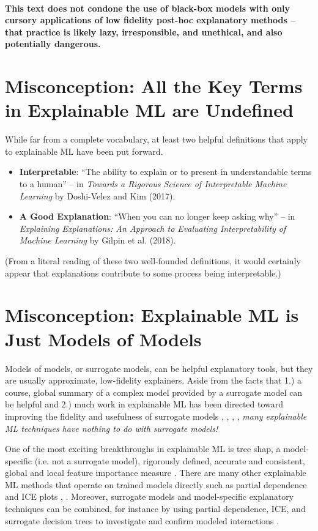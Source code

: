 \documentclass{article}
\begin{document}
\paragraph{This text does not condone the use of black-box models with only cursory applications of low fidelity post-hoc explanatory methods -- that practice is likely lazy, irresponsible, and unethical, and also potentially dangerous.}

\section{Misconception: All the Key Terms in Explainable ML are Undefined}

While far from a complete vocabulary, at least two helpful definitions that apply to explainable ML have been put forward.

\begin{itemize}
\item \textbf{Interpretable}: ``The ability to explain or to present in understandable terms to a human'' -- in \textit{Towards a Rigorous Science of Interpretable Machine Learning} by Doshi-Velez and Kim (2017).
\item \textbf{A Good Explanation}: ``When you can no longer keep asking why'' -- in \textit{Explaining Explanations: An Approach to Evaluating Interpretability of Machine Learning} by Gilpin et al. (2018).
\end{itemize}

(From a literal reading of these two well-founded definitions, it would certainly appear that explanations contribute to some process being interpretable.)  

\section{Misconception: Explainable ML is Just Models of Models}

Models of models, or surrogate models, can be helpful explanatory tools, but they are usually approximate, low-fidelity explainers. Aside from the facts that 1.) a course, global summary of a complex model provided by a surrogate model can be helpful and 2.) much work in explainable ML has been directed toward improving the fidelity and usefulness of surrogate models \citep{dt_surrogate1}, \cite{dt_surrogate2}, \cite{lime-sup}, \cite{wf_xnn}, \textit{many explainable ML techniques have nothing to do with surrogate models!}   

One of the most exciting breakthroughs in explainable ML is tree shap, a model-specific (i.e. not a surrogate model), rigorously defined, accurate and consistent, global and local feature importance measure \cite{tree_shap}. There are many other explainable ML methods that operate on trained models directly such as partial dependence and ICE plots \cite{esl}, \cite{ice_plots}. Moreover, surrogate models and model-specific explanatory techniques can be combined, for instance by using partial dependence, ICE, and surrogate decision trees to investigate and confirm modeled interactions \cite{art_and_sci}. 
\end{document}
